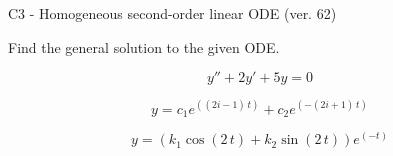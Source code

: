 \begin{exercise}
  \begin{exerciseTitle}C3 - Homogeneous second-order linear ODE (ver. 62)\end{exerciseTitle}
  \begin{exerciseStatement}
    
Find the general solution to the given ODE.

    
\[y''+2y'+5y = 0\]

  \end{exerciseStatement}
  \begin{exerciseAnswer}
    
\[y= c_{1} e^{\left(\left(2 i - 1\right) \, t\right)} + c_{2} e^{\left(-\left(2 i + 1\right) \, t\right)}\]

    
\[y= {\left(k_{1} \cos\left(2 \, t\right) + k_{2} \sin\left(2 \, t\right)\right)} e^{\left(-t\right)}\]

  \end{exerciseAnswer}
\end{exercise}